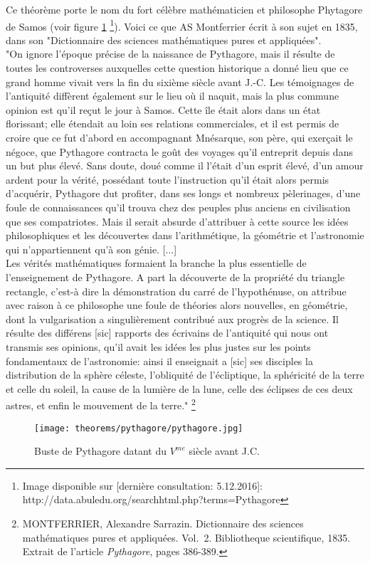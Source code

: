 \documentclass[a4paper,12pt]{article}
\begin{document}
\begin{remark}
Ce théorème porte le nom du fort célèbre mathématicien et philosophe Phytagore de Samos (voir figure  \ref{fig:pythagore} \footnote{Image disponible sur [dernière consultation: 5.12.2016]: http://data.abuledu.org/searchhtml.php?terms=Pythagore}). Voici ce que AS Montferrier écrit à son sujet en 1835, dans son "Dictionnaire des sciences mathématiques pures et appliquées".\\

"On ignore l’époque précise de la naissance de Pythagore, mais il résulte de toutes les controverses auxquelles cette question historique a donné lieu que ce grand homme vivait vers la fin du sixième siècle avant J.-C. Les témoignages de l’antiquité diffèrent également sur le lieu où il naquit, mais la plus commune opinion est qu’il reçut le jour à Samos. Cette île était alors dans un état florissant; elle étendait au loin ses relations commerciales, et il est permis de croire que ce fut d'abord en accompagnant Mnésarque, son père, qui exerçait le négoce, que Pythagore contracta le goût des voyages qu’il entreprit depuis dans un but
plus élevé. Sans doute, doué comme il l’était d’un esprit élevé, d’un amour ardent pour la vérité, possédant toute l'instruction qu’il était alors permis d’acquérir, Pythagore dut profiter, dans ses longs et nombreux pèlerinages, d’une foule de connaissances qu’il trouva chez des peuples plus anciens en civilisation que ses compatriotes. Mais il serait absurde d’attribuer à cette source les idées philosophiques et les découvertes dans l'arithmétique, la géométrie et l’astronomie qui n’appartiennent qu’à son génie.
[...]\\
Les vérités mathématiques formaient la branche la plus essentielle de l’enseignement de Pythagore. A part la découverte de la propriété du triangle rectangle, c’est-à dire la démonstration du carré de l’hypothénuse, on attribue avec raison à ce philosophe une foule de théories alors nouvelles, en géométrie, dont la vulgarisation a singulièrement contribué aux progrès de la science. Il résulte des différens [sic] rapports des écrivains de l’antiquité qui nous ont transmis ses opinions, qu’il avait les idées les plus justes sur les points fondamentaux de l’astronomie: ainsi il enseignait a [sic] ses disciples la distribution de la sphère céleste, l’obliquité de l’écliptique, la sphéricité de la terre et celle du soleil, la cause de la lumière de la lune, celle des éclipses de ces deux astres, et enfin le mouvement de la terre." \footnote{MONTFERRIER, Alexandre Sarrazin. Dictionnaire des sciences mathématiques pures et appliquées. Vol.~2. Bibliotheque scientifique, 1835. Extrait de l'article \textit{Pythagore}, pages 386-389.}

\begin{figure}[H]\label{fig:pythagore}
    \centering
    \texttt{[image: theorems/pythagore/pythagore.jpg]}
    
    \caption{Buste de Pythagore datant du $V^{me}$ siècle avant J.C.}
    \label{fig:pythagore}
\end{figure}

\end{remark}
\end{document}
